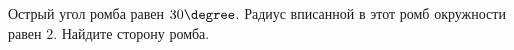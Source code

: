 \begin{ex}
	\begin{condition}
		Острый угол ромба равен \( 30 \degree\). Радиус вписанной в этот ромб окружности равен \( 2 \). Найдите сторону ромба.
	\end{condition}
\end{ex}